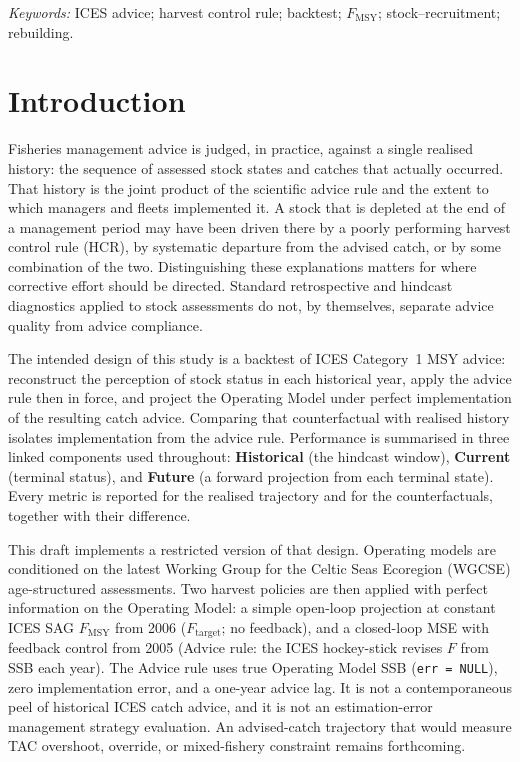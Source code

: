 \documentclass[11pt,a4paper]{article}
\newcommand{\Fmsy}{F_{\mathrm{MSY}}}
\begin{document}
\noindent\textit{Keywords:} ICES advice; harvest control rule; backtest;
$F_{\mathrm{MSY}}$; stock--recruitment; rebuilding.

\section{Introduction}
\label{sec:intro}

Fisheries management advice is judged, in practice, against a single
realised history: the sequence of assessed stock states and catches that
actually occurred. That history is the joint product of the scientific
advice rule and the extent to which managers and fleets implemented it.
A stock that is depleted at the end of a management period may have been
driven there by a poorly performing harvest control rule (HCR), by
systematic departure from the advised catch, or by some combination of
the two. Distinguishing these explanations matters for where corrective
effort should be directed. Standard retrospective and hindcast
diagnostics applied to stock assessments do not, by themselves, separate
advice quality from advice compliance.

The intended design of this study \citep{ices2023advice} is a backtest of
ICES Category~1 MSY advice: reconstruct the perception of stock status
in each historical year, apply the advice rule then in force, and
project the Operating Model under perfect implementation of the
resulting catch advice. Comparing that counterfactual with realised
history isolates implementation from the advice rule. Performance is
summarised in three linked components used throughout: \textbf{Historical}
(the hindcast window), \textbf{Current} (terminal status), and
\textbf{Future} (a forward projection from each terminal state). Every
metric is reported for the realised trajectory and for the
counterfactuals, together with their difference.

This draft implements a restricted version of that design. Operating
models are conditioned on the latest Working Group for the Celtic Seas
Ecoregion (WGCSE) age-structured assessments. Two harvest policies are
then applied with perfect information on the Operating Model: a simple
open-loop projection at constant ICES SAG $\Fmsy$ from 2006
($F_{\mathrm{target}}$; no feedback), and a closed-loop MSE with
feedback control from 2005 (Advice rule: the ICES hockey-stick revises
$F$ from SSB each year). The Advice rule uses true Operating Model SSB
(\texttt{err = NULL}), zero implementation error, and a one-year advice
lag. It is not a contemporaneous peel of historical ICES catch advice,
and it is not an estimation-error management strategy evaluation. An
advised-catch trajectory that would measure TAC overshoot, override, or
mixed-fishery constraint remains forthcoming.
\end{document}
